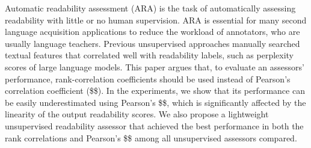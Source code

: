 Automatic readability assessment (ARA) is the task of automatically assessing readability with little or no human supervision. ARA is essential for many second language acquisition applications to reduce the workload of annotators, who are usually language teachers. Previous unsupervised approaches manually searched textual features that correlated well with readability labels, such as perplexity scores of large language models. This paper argues that, to evaluate an assessors' performance, rank-correlation coefficients should be used instead of Pearson's correlation coefficient (\$\rho\$). In the experiments, we show that its performance can be easily underestimated using Pearson's \$\rho\$, which is significantly affected by the linearity of the output readability scores. We also propose a lightweight unsupervised readability assessor that achieved the best performance in both the rank correlations and Pearson's \$\rho\$ among all unsupervised assessors compared.
